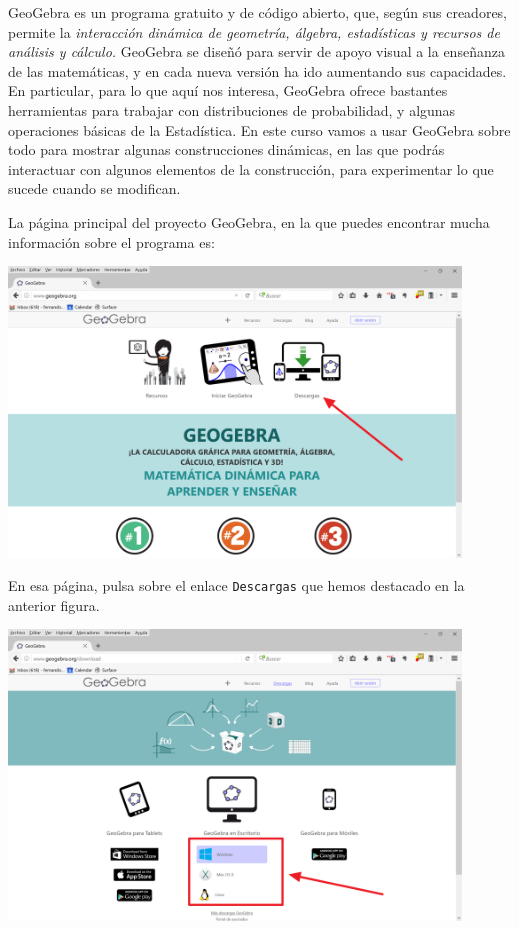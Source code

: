 \documentclass[10pt,a4paper]{article}\usepackage[]{graphicx}\usepackage[]{color}
\newcounter {cont01}
\begin{document}
GeoGebra  es un programa gratuito y de código abierto, que, según sus creadores, permite la {\em
interacción dinámica de geometría, álgebra, estadísticas y recursos de análisis y cálculo.}
GeoGebra  se diseñó para servir de apoyo visual a la enseñanza de las matemáticas, y en cada nueva
versión ha ido aumentando sus capacidades. En particular, para lo que aquí nos interesa,  GeoGebra
ofrece bastantes herramientas para trabajar con distribuciones de probabilidad, y algunas
operaciones básicas de la Estadística. En este curso vamos a usar  GeoGebra  sobre todo para
mostrar algunas construcciones dinámicas, en las que podrás interactuar con algunos elementos de la
construcción, para experimentar lo que sucede cuando se modifican.

La página principal del proyecto GeoGebra, en la que puedes encontrar mucha información sobre el
programa es:
\begin{center}
\end{center}
    \begin{center}
    \includegraphics[width=12cm]{../fig/Tut00-GeoGebraDescarga01-201605.png}
    \end{center}
En esa página, pulsa sobre el enlace {\tt Descargas} que hemos destacado en la anterior
figura.
    \begin{center}
    \includegraphics[width=12cm]{../fig/Tut00-GeoGebraDescarga02-201605.png}
    \end{center}
\end{document}
